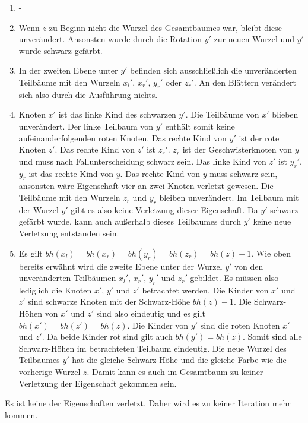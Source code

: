 \documentclass[a4paper,12pt]{article}
\begin{document}
\begin{enumerate}
	\item -
	\item Wenn $z$ zu Beginn nicht die Wurzel des Gesamtbaumes war, bleibt diese unverändert. Ansonsten wurde durch die Rotation $y'$ zur neuen Wurzel und $y'$ wurde schwarz gefärbt. 
	\item  In der zweiten Ebene unter $y'$ befinden sich ausschließlich die unveränderten Teilbäume mit den Wurzeln ${x_l}'$, ${x_r}'$, ${y_r}'$ oder ${z_r}'$. An den Blättern verändert sich also durch die Ausführung nichts.
	\item  Knoten $x'$ ist das linke Kind des schwarzen $y'$. Die Teilbäume von $x'$ blieben unverändert. Der linke Teilbaum von $y'$ enthält somit keine aufeinanderfolgenden roten Knoten. Das rechte Kind von $y'$ ist der rote Knoten $z'$. Das rechte Kind von $z'$ ist ${z_r}'$.  ${z_r}$ ist der Geschwisterknoten von $y$ und muss nach Fallunterscheidung schwarz sein. Das linke Kind von $z'$ ist ${y_r}'$. ${y_r}$ ist das rechte Kind von $y$. Das rechte Kind von $y$ muss schwarz sein, ansonsten wäre Eigenschaft vier an zwei Knoten verletzt gewesen. Die Teilbäume mit den Wurzeln ${z_r}$ und  ${y_r}$ bleiben unverändert. Im Teilbaum mit der Wurzel $y'$ gibt es also keine Verletzung dieser Eigenschaft. Da $y'$ schwarz gefärbt wurde, kann auch außerhalb dieses Teilbaumes durch $y'$ keine neue Verletzung entstanden sein.
	\item  Es gilt  $\mathit{bh(x_l)} = \mathit{bh(x_r)} = \mathit{bh(y_r)} =  \mathit{bh(z_r)} = \mathit{bh(z)} - 1$. Wie oben bereits erwähnt wird die zweite Ebene unter der Wurzel $y'$ von den unveränderten Teilbäumen ${x_l}'$, ${x_r}'$, ${y_r}'$ und ${z_r}'$ gebildet. Es müssen also lediglich die Knoten $x'$, $y'$ und $z'$ betrachtet werden. Die Kinder von $x'$ und $z'$ sind schwarze Knoten mit der Schwarz-Höhe $\mathit{bh(z)} - 1$. Die Schwarz-Höhen von $x'$ und $z'$ sind also eindeutig und es gilt \mbox{$\mathit{bh(x')} = \mathit{bh(z')} = \mathit{bh(z)}$}. Die Kinder von $y'$ sind die roten Knoten $x'$ und $z'$. Da beide Kinder rot sind gilt auch  $\mathit{bh(y')}  = \mathit{bh(z)}$. Somit sind alle Schwarz-Höhen im betrachteten Teilbaum eindeutig. Die neue Wurzel des Teilbaumes $y'$ hat die gleiche Schwarz-Höhe und die gleiche Farbe wie die vorherige Wurzel $z$. Damit kann es auch im Gesamtbaum zu keiner Verletzung der Eigenschaft gekommen sein.
\end{enumerate} 

\noindent Es ist keine der Eigenschaften verletzt. Daher wird es zu keiner Iteration mehr kommen.
\end{document}
